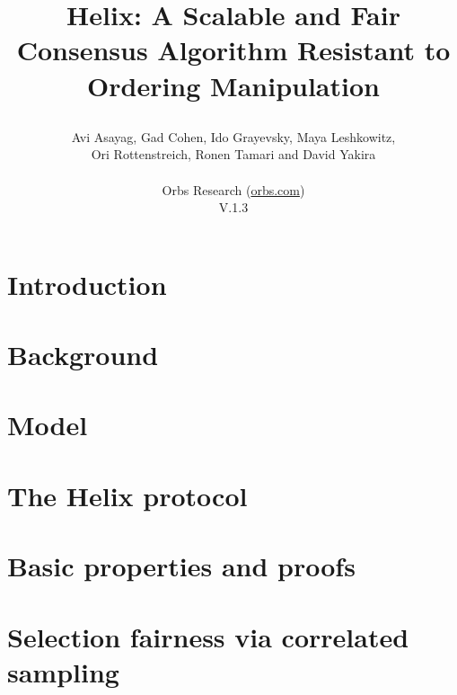 \documentclass[10pt, conference, letterpaper]{IEEEtran}
\theoremstyle{nodot}
\theoremstyle{dot}
\newcommand{\name}{Helix }
\newcommand{\nameNS}{Helix}
\begin{document}
\title{\nameNS: A Scalable and Fair Consensus Algorithm Resistant to Ordering Manipulation
\\
\begin{large}
\end{large}}
\author{Avi Asayag, Gad Cohen, Ido Grayevsky, Maya Leshkowitz,\\ Ori Rottenstreich, Ronen Tamari and David Yakira \\ \\  
Orbs Research (\href{www.orbs.com}{orbs.com})
\\ V.1.3
}
\maketitle
\thispagestyle{empty}
\pagestyle{plain}

\begin{abstract}

\end{abstract}

\section{Introduction}


\section{Background}
\label{section_background}



\section{Model}
\label{section_model}



\section{The \name protocol}
\label{section_Protocol}



\section{Basic properties and proofs}
\label{section_properties}



\section{Selection fairness via correlated sampling}
\label{section_highload}

\end{document}
